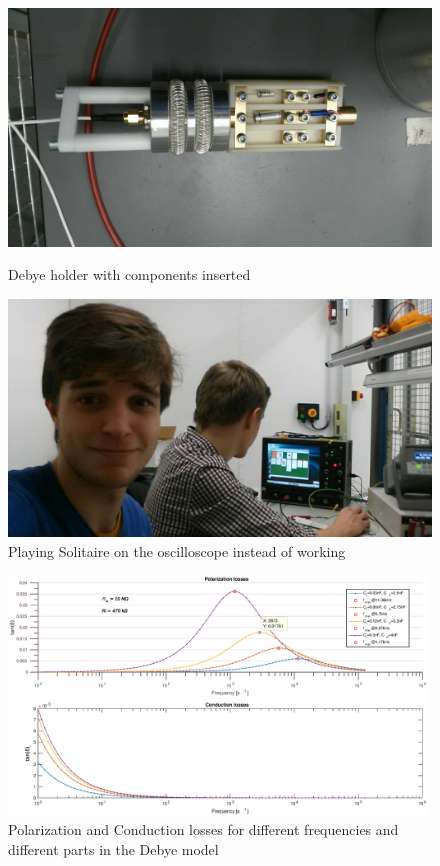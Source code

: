\begin{figure}[h!tb]
 \centering
 \begin{minipage}{0.4\textwidth}
 \includegraphics[width=\textwidth]{figures/Method/Experimentaufbau/debyesample}
 \caption[Kurze Abbildungsbeschreibung]{Debye holder with components inserted}
 \end{minipage}\qquad
 \begin{minipage}{0.4\textwidth}
 \includegraphics[width=\textwidth]{figures/Method/Experimentaufbau/hardwork}
 \caption[Kurze Abbildungsbeschreibung]{Playing Solitaire on the oscilloscope instead of working}
 \end{minipage}
 
 \end{figure}

\begin{figure}
\includegraphics[width=0.99\textwidth]{figures/Method/Dielectric_loss/polarizationmultiple.eps}
    \caption{Polarization and Conduction losses for different frequencies and different parts in the Debye model}
    \label{fig.debye-modell}
   \end{figure}

